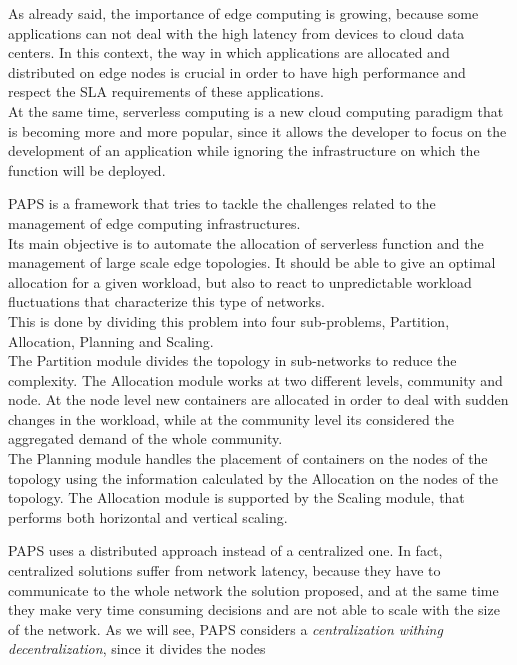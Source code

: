 As already said, the importance of edge computing is growing, because some applications can not 
deal with the high latency from devices to cloud data centers.
In this context, the way in which applications are allocated and distributed on
edge nodes is crucial in order to have high performance and respect the SLA requirements
of these applications.
\\
At the same time, serverless computing is a new cloud computing paradigm that is becoming more
and more popular, since it allows the developer to focus on the development of an application
while ignoring the infrastructure on which the function will be deployed.
\par
PAPS is a framework that tries to tackle the challenges related to the management of edge computing infrastructures.
\\
Its main objective is to automate the allocation of serverless function and the management of large scale edge topologies.
It should be able to give an optimal allocation for a given workload, but also
to react to unpredictable workload fluctuations that characterize this type of networks.
\\
This is done by dividing this problem into four sub-problems, Partition, Allocation, Planning and Scaling.
\\
The Partition module divides the topology in sub-networks to reduce the complexity.
The Allocation module works at two different levels, community and node. At the node level new containers
are allocated in order to deal with sudden changes in the workload, while at the community level
its considered the aggregated demand of the whole community.
\\
The Planning module handles the placement of containers on the nodes of the topology using
the information calculated by the Allocation on the nodes of the topology.
The Allocation module is supported by the Scaling module, that performs both horizontal and vertical scaling.
\par
PAPS uses a distributed approach instead of a centralized one.
In fact, centralized solutions
suffer from network latency, because they have to communicate to the whole network the solution proposed,
and at the same time they make very time consuming decisions and are not able to scale  with the size of the network.
As we will see, PAPS considers a  \textit{centralization withing decentralization}, since it divides the nodes
